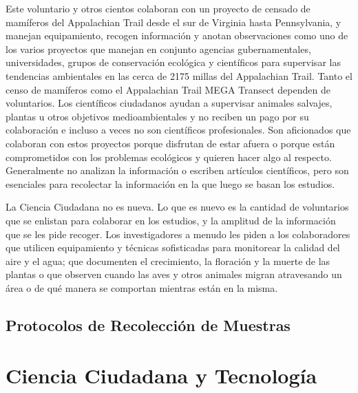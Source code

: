 	Este voluntario y otros cientos colaboran con un proyecto de censado de mamíferos del Appalachian Trail desde el sur de Virginia hasta Pennsylvania, y manejan equipamiento, recogen información y anotan observaciones como uno de los varios proyectos que manejan en conjunto agencias gubernamentales, universidades, grupos de conservación ecológica y científicos para supervisar las tendencias ambientales en las cerca de 2175 millas del Appalachian Trail. Tanto el censo de mamíferos como el Appalachian Trail MEGA Transect dependen de voluntarios. Los científicos ciudadanos ayudan a supervisar animales salvajes, plantas u otros objetivos medioambientales y no reciben un pago por su colaboración e incluso a veces no son científicos profesionales. Son aficionados que colaboran con estos proyectos porque disfrutan de estar afuera o porque están comprometidos con los problemas ecológicos y quieren hacer algo al respecto. Generalmente no analizan la información o escriben artículos científicos, pero son esenciales para recolectar la información en la que luego se basan los estudios. 
	
	La Ciencia Ciudadana no es nueva. Lo que es nuevo es la cantidad de voluntarios que se enlistan para colaborar en los estudios, y la amplitud de la información que se les pide recoger. Los investigadores a menudo les piden a los colaboradores que utilicen equipamiento y técnicas sofisticadas para monitorear la calidad del aire y el agua; que documenten el crecimiento, la floración y la muerte de las plantas o que observen cuando las aves y otros animales migran atravesando un área o de qué manera se comportan mientras están en la misma. 
	

\subsection{Protocolos de Recolección de Muestras}



\section{Ciencia Ciudadana y Tecnología}

